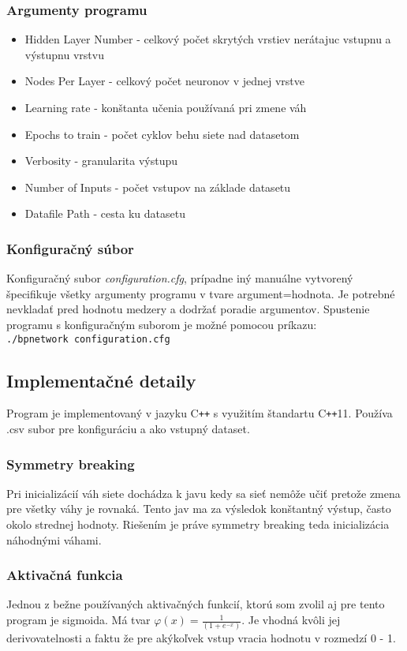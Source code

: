 \documentclass[a4paper, 11pt]{article}
\begin{document}
\subsubsection*{Argumenty programu}
\begin{itemize}
	\item[] Hidden Layer Number - celkový počet skrytých vrstiev nerátajuc vstupnu a výstupnu vrstvu
	\item[] Nodes Per Layer - celkový počet neuronov v jednej vrstve
	\item[] Learning rate - konštanta učenia používaná pri zmene váh
	\item[] Epochs to train - počet cyklov behu siete nad datasetom
	\item[] Verbosity - granularita výstupu
	\item[] Number of Inputs - počet vstupov na základe datasetu
	\item[] Datafile Path - cesta ku datasetu
\end{itemize}
\subsubsection*{Konfiguračný súbor}
Konfiguračný subor \textit{configuration.cfg}, prípadne iný manuálne vytvorený špecifikuje všetky argumenty programu v tvare argument=hodnota. Je potrebné nevkladať pred hodnotu medzery a dodržať poradie argumentov. Spustenie programu s konfiguračným suborom je možné pomocou príkazu:\\
\texttt{./bpnetwork configuration.cfg}
\subsection{Implementačné detaily}
Program je implementovaný v jazyku C\texttt{++} s využitím štandartu C\texttt{++}11. Používa .csv subor pre konfiguráciu a ako vstupný dataset.
\subsubsection*{Symmetry breaking}
Pri inicializácií váh siete dochádza k javu kedy sa sieť nemôže učiť pretože zmena pre všetky váhy je rovnaká. Tento jav ma za výsledok konštantný výstup, často okolo strednej hodnoty. Riešením je práve symmetry breaking teda inicializácia náhodnými váhami. 
\subsubsection*{Aktivačná funkcia}
Jednou z bežne používaných aktivačných funkcií, ktorú som zvolil aj pre tento program je sigmoida. Má tvar $\varphi (x) =\frac{1}{(1+e^{-x})}$. Je vhodná kvôli jej derivovatelnosti a faktu že pre akýkoľvek vstup vracia hodnotu v rozmedzí 0 \-- 1.
\end{document}

